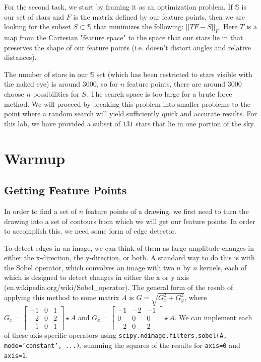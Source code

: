 \documentclass[paper=a4, fontsize=11pt]{scrartcl} %
\begin{document}
For the second task, we start by framing it as an optimization problem. If $\mathbb{S}$ is our set of stars and $F$ is the matrix defined by our feature points, then we are looking for the subset $S\subset\mathbb{S}$ that minimizes the following: $||TF - S||_F$.  Here $T$ is a map from the Cartesian "feature space" to the space that our stars lie in that preserves the shape of our feature points (i.e. doesn't distort angles and relative distances).

The number of stars in our $\mathbb{S}$ set (which has been restricted to stars visible with the naked eye) is around 3000, so for $n$ feature points, there are around 3000 choose $n$ possibilities for $S$. The search space is too large for a brute force method.  We will proceed by breaking this problem into smaller problems to the point where a random search will yield sufficiently quick and accurate results. For this lab, we have provided a subset of $131$ stars that lie in one portion of the sky.
\section{Warmup}

\subsection{Getting Feature Points}

In order to find a set of $n$ feature points of a drawing, we first need to turn the drawing into a set of contours from which we will get our feature points. In order to accomplish this, we need some form of edge detector. 

To detect edges in an image, we can think of them as large-amplitude changes in either the x-direction, the y-direction, or both. A standard way to do this is with the Sobel operator, which convolves an image with two $n$ by $n$ kernels, each of which is designed to detect changes in either the x or y axis (en.wikipedia.org/wiki/Sobel\_operator). The general form of the result of applying this method to some matrix $A$ is $G = \sqrt{G_x^2 + G_y^2}$, where $G_x = \begin{bmatrix}
-1& 0 & 1\\
-2 & 0& 2\\
-1 & 0& 1
\end{bmatrix}\star A$ and $G_x =\begin{bmatrix}
-1 & -2 & -1\\
0 & 0 & 0\\
-2 & 0 & 2
\end{bmatrix} \star A$. We can implement each of these axis-specific operators using \texttt{scipy.ndimage.filters.sobel(A, mode='constant', ...)}, summing the squares of the results for \texttt{axis=0} and \texttt{axis=1}.
\end{document}
